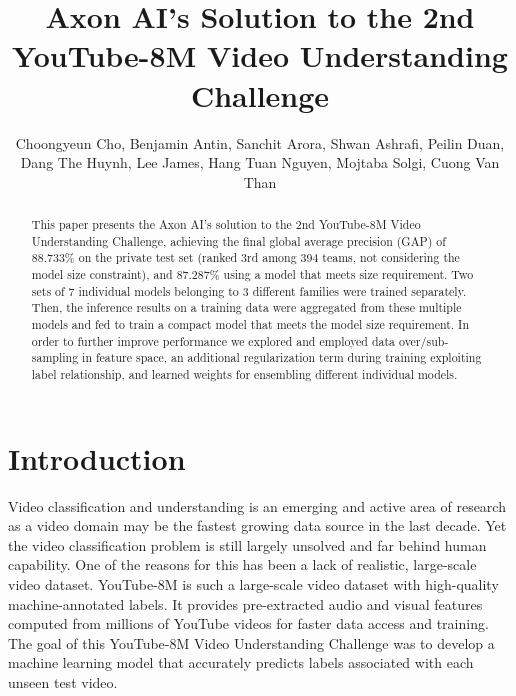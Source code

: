 \documentclass[runningheads]{llncs}
\begin{document}
\pagestyle{headings}
\mainmatter
\def\ECCV18SubNumber{***}  %
\title{Axon AI's Solution to the 2nd YouTube-8M Video Understanding Challenge}
\titlerunning{ECCV-18 submission ID \ECCV18SubNumber}
\authorrunning{ECCV-18 submission ID \ECCV18SubNumber}
\author{Choongyeun Cho, Benjamin Antin, Sanchit Arora, Shwan Ashrafi, Peilin Duan, Dang The Huynh, Lee James, Hang Tuan Nguyen, Mojtaba Solgi, Cuong Van Than}
\maketitle

\begin{abstract}
This paper presents the Axon AI's solution to the 2nd YouTube-8M Video Understanding Challenge, achieving the final global average precision (GAP) of 88.733\% on the private test set (ranked 3rd among 394 teams, not considering the model size constraint), and 87.287\% using a model that meets size requirement.
Two sets of 7 individual models belonging to 3 different families were trained separately.
Then, the inference results on a training data were aggregated from these multiple models and fed to train a compact model that meets the model size requirement.
In order to further improve performance we explored and employed data over/sub-sampling in feature space, an additional regularization term during training exploiting label relationship, and learned weights for ensembling different individual models.
\end{abstract}

\section{Introduction}
Video classification and understanding is an emerging and active area of research as a video domain may be the fastest growing data source in the last decade.
Yet the video classification problem is still largely unsolved and far behind human capability.
One of the reasons for this has been a lack of realistic, large-scale video dataset.
YouTube-8M is such a large-scale video dataset with high-quality machine-annotated labels.
It provides pre-extracted audio and visual features computed from millions of YouTube videos for faster data access and training.
The goal of this YouTube-8M Video Understanding Challenge was to develop a machine learning model that accurately predicts labels associated with each unseen test video.
\end{document}
